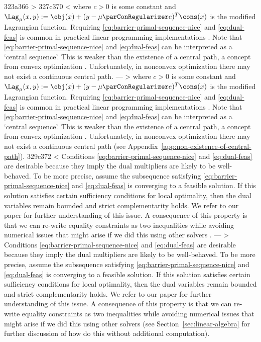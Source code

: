 323a366
> 
327c370
< where $c > 0$ is some constant and $\Lag_{\mu} (x, y) := \obj(x) + (y - \mu \parConRegularizer e)^T \cons(x)$ is the modified Lagrangian function. Requiring \eqref{eq:barrier-primal-sequence-nice} and \eqref{eq:dual-feas} is common in practical linear programming implementations \cite{mehrotra1992implementation}. Note that \eqref{eq:barrier-primal-sequence-nice} and \eqref{eq:dual-feas} can be interpreted as a `central sequence'. This is weaker than the existence of a central path, a concept from convex optimization \cite{andersen1999homogeneous,megiddo1989pathways}. Unfortunately, in nonconvex optimization there may not exist a continuous central path.
---
> where $c > 0$ is some constant and $\Lag_{\mu} (x, y) := \obj(x) + (y - \mu \parConRegularizer e)^T \cons(x)$ is the modified Lagrangian function. Requiring \eqref{eq:barrier-primal-sequence-nice} and \eqref{eq:dual-feas} is common in practical linear programming implementations \cite{mehrotra1992implementation}\if{} \cite{more} \fi. Note that \eqref{eq:barrier-primal-sequence-nice} and \eqref{eq:dual-feas} can be interpreted as a `central sequence'. This is weaker than the existence of a central path, a concept from convex optimization \cite{andersen1999homogeneous,megiddo1989pathways}. Unfortunately, in nonconvex optimization there may not exist a continuous central path\if{} (see Appendix~\ref{app:non-existence-of-central-path})\fi.
329c372
< Conditions \eqref{eq:barrier-primal-sequence-nice} and \eqref{eq:dual-feas} are desirable because they imply the dual multipliers are likely to be well-behaved. To be more precise, assume the subsequence satisfying \eqref{eq:barrier-primal-sequence-nice} and \eqref{eq:dual-feas} is converging to a feasible solution. If this solution satisfies certain sufficiency conditions for local optimality, then the dual variables remain bounded and strict complementarity holds. We refer to our paper \cite{haeser2017behavior} for further understanding of this issue. A consequence of this property is that we can re-write equality constraints as two inequalities while avoiding numerical issues that might arise if we did this using other solvers \cite{haeser2017behavior}.
---
> Conditions \eqref{eq:barrier-primal-sequence-nice} and \eqref{eq:dual-feas} are desirable because they imply the dual multipliers are likely to be well-behaved. To be more precise, assume the subsequence satisfying \eqref{eq:barrier-primal-sequence-nice} and \eqref{eq:dual-feas} is converging to a feasible solution. If this solution satisfies certain sufficiency conditions for local optimality, then the dual variables remain bounded and strict complementarity holds. We refer to our paper \cite{haeser2017behavior} for further understanding of this issue. A consequence of this property is that we can re-write equality constraints as two inequalities while avoiding numerical issues that might arise if we did this using other solvers \cite{haeser2017behavior}\if{} (see Section~\ref{sec:linear-algebra} for further discussion of how do this without additional computation)\fi.
